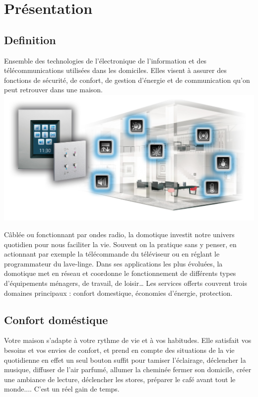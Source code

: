 \documentclass[12pt]{article}
\begin{document}

\section{Présentation}

\subsection{Definition}
Ensemble des technologies de l'électronique de l'information et des télécommunications utilisées dans les domiciles. Elles visent à assurer des fonctions de sécurité, de confort, de gestion d'énergie et de communication qu'on peut retrouver dans une maison.
\includegraphics[scale = 0.75]{page1.jpg}

Câblée ou fonctionnant par ondes radio, la domotique investit notre univers quotidien pour nous faciliter la vie. Souvent on la pratique sans y penser, en actionnant par exemple la télécommande du téléviseur ou en réglant le programmateur du lave-linge. Dans ses applications les plus évoluées, la domotique met en réseau et coordonne le fonctionnement de différents types d’équipements ménagers, de travail, de loisir… Les services offerts couvrent trois domaines principaux : confort domestique, économies d’énergie, protection.

\subsection{Confort doméstique}
Votre maison s'adapte à votre rythme de vie et à vos habitudes. Elle satisfait vos besoins et vos envies de confort, et prend en compte des situations de la vie quotidienne en effet un seul bouton suffit pour tamiser l'éclairage, déclencher la musique, diffuser de l'air parfumé, allumer la cheminée fermer son domicile, créer une ambiance de lecture, déclencher les stores, préparer le café avant tout le monde.... C’est un réel gain de temps.
\end{document}
